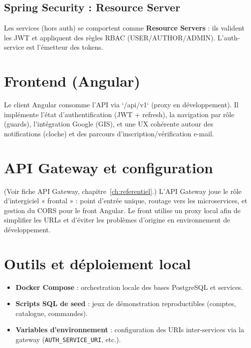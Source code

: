 \documentclass[12pt,a4paper]{report}
\begin{document}
\subsection{Spring Security : Resource Server}
Les services (hors auth) se comportent comme \textbf{Resource Servers} : ils valident les JWT et appliquent des règles RBAC (USER/AUTHOR/ADMIN). L'auth-service est l'émetteur des tokens.\par

\section{Frontend (Angular)}
Le client Angular consomme l'API via `/api/v1` (proxy en développement). Il implémente l'état d'authentification (JWT + refresh), la navigation par rôle (guards), l'intégration Google (GIS), et une UX cohérente autour des notifications (cloche) et des parcours d'inscription/vérification e-mail.\par

\section{API Gateway et configuration}
(Voir fiche API Gateway, chapitre~\ref{ch:referentiel}.) L'API Gateway joue le rôle d'intergiciel « frontal » : point d'entrée unique, routage vers les microservices, et gestion du CORS pour le front Angular. Le front utilise un proxy local afin de simplifier les URLs et d'éviter les problèmes d'origine en environnement de développement.\par

\section{Outils et déploiement local}
\begin{itemize}
  \item \textbf{Docker Compose} : orchestration locale des bases PostgreSQL et services.
  \item \textbf{Scripts SQL de seed} : jeux de démonstration reproductibles (comptes, catalogue, commandes).
  \item \textbf{Variables d'environnement} : configuration des URIs inter-services via la gateway (\texttt{AUTH\_SERVICE\_URI}, etc.).
\end{itemize}

\end{document}
